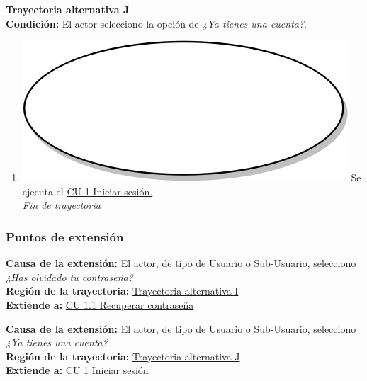 \textbf{Trayectoria alternativa J} \label{cu2_ta_j}\\
\textbf{Condición:} El actor selecciono la opción de \textit{¿Ya tienes una cuenta?}.\\
 \begin{enumerate}[label=J\arabic*]
    \item {\includegraphics[scale=.05]{Capitulo3/img/proceso.png} Se ejecuta el \hyperref[cu1]{CU 1 Iniciar sesión.}}\\
    \textit{Fin de trayectoria} \\
\end{enumerate}

\subsubsection{Puntos de extensión}
\noindent \textbf{Causa de la extensión:} El actor, de tipo de Usuario o Sub-Usuario, selecciono \textit{¿Has olvidado tu contraseña?} \\
\textbf{Región de la trayectoria:} \hyperref[cu2_ta_i]{Trayectoria alternativa I} \\
\textbf{Extiende a:} \hyperref[cu1_1]{CU 1.1 Recuperar contraseña} \\ \par

\noindent \textbf{Causa de la extensión:} El actor, de tipo de Usuario o Sub-Usuario, selecciono \textit{¿Ya tienes una cuenta?} \\
\textbf{Región de la trayectoria:} \hyperref[cu2_ta_j]{Trayectoria alternativa J} \\
\textbf{Extiende a:} \hyperref[cu1]{CU 1 Iniciar sesión}
